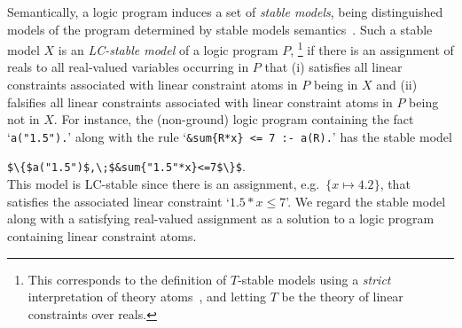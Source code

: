 Semantically, a logic program induces a set of \emph{stable models},
being distinguished models of the program determined by stable models semantics~\citep{gellif91a}.
%
Such a stable model $X$ is an \emph{LC-stable model} of a logic program $P$,%
\footnote{This corresponds to the definition of $T$-stable models using a \emph{strict} interpretation of theory atoms~\citep{gekakaosscwa16a},
  and letting $T$ be the theory of linear constraints over reals.}
if there is an assignment of reals to all real-valued variables occurring in $P$ that
(i)     satisfies all linear constraints associated with linear constraint atoms in $P$ being     in $X$
and
(ii) falsifies all linear constraints associated with linear constraint atoms in $P$ being not in $X$.
%
For instance, the (non-ground) logic program containing the fact
`\lstinline[mathescape=true]{a("1.5").}'
along with the rule
`\lstinline[mathescape=true]@&sum{R*x} <= 7 :- a(R).@'
has the stable model
\par
\lstinline[mathescape=true]@$\{$a("1.5")$,\;$&sum{"1.5"*x}<=7$\}$@.
\\
This model is LC-stable since there is an assignment,
e.g.\ $\{x\mapsto 4.2\}$,
that satisfies the associated linear constraint `$1.5*x\leq 7$'.
We regard the stable model along with a satisfying real-valued assignment as a solution to a logic program containing linear constraint atoms.

